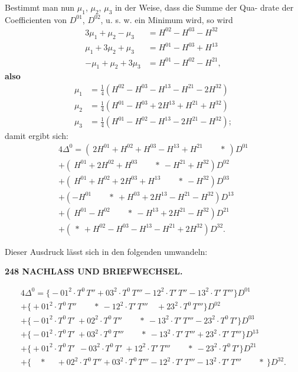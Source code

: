 \documentclass[12pt,a4paper]{article}
\theoremstyle{plain}
\theoremstyle{definition}
\theoremstyle{remark}
\begin{document}
Bestimmt man nun $\mu_1$, $\mu_2$, $\mu_3$ in der Weise, dass die Summe der Qua-
drate der Coefficienten von $D^{01}$, $D^{02}$, u. s. w. ein Minimum wird, so wird
\begin{align*}
3\mu_1 + \mu_2 - \mu_3 &= H^{02} - H^{03} - H^{32} \\
\mu_1 + 3\mu_2 + \mu_3 &= H^{01} - H^{03} + H^{13} \\
-\mu_1 + \mu_2 + 3\mu_3 &= H^{01} - H^{02} - H^{21},
\end{align*}
\textbf{also}
\begin{align*}
\mu_1 &= \tfrac{1}{4}(H^{02} - H^{03} - H^{13} - H^{21} - 2H^{32}) \\
\mu_2 &= \tfrac{1}{4}(H^{01} - H^{03} + 2H^{13} + H^{21} + H^{32}) \\
\mu_3 &= \tfrac{1}{4}(H^{01} - H^{02} - H^{13} - 2H^{21} - H^{32});
\end{align*}
damit ergibt sich:
\begin{multline*}
4\Delta^0 = (\ 2H^{01} + H^{02} + H^{03} - H^{13} + H^{21} \qquad *\ ) D^{01} \\
+ (\ H^{01} + 2H^{02} + H^{03} \qquad *\ - H^{21} + H^{32}) D^{02} \\
+ (\ H^{01} + H^{02} + 2H^{03} + H^{13} \qquad *\ - H^{32}) D^{03} \\
+ (-H^{01} \qquad *\ + H^{03} + 2H^{13} - H^{21} - H^{32}) D^{13} \\
+ (\ H^{01} - H^{02} \qquad *\ - H^{13} + 2H^{21} - H^{32}) D^{21} \\
+ (\ *\ + H^{02} - H^{03} - H^{13} - H^{21} + 2H^{32}) D^{32}.
\end{multline*}

Dieser Ausdruck l\"asst sich in den folgenden umwandeln:


\newpage

\noindent\textbf{248 NACHLASS UND BRIEFWECHSEL.}

\begin{multline*}
4\Delta^0 = \bigl\{-01^2 \cdot T^0\,T'' + 03^2 \cdot T^0\,T''' - 12^2 \cdot T'\,T'' - 13^2 \cdot T'\,T'''\bigr\} D^{01} \\
+ \bigl\{+01^2 \cdot T^0\,T'' \qquad *\ - 12^2 \cdot T'\,T''' \quad + 23^2 \cdot T^0\,T'''\bigr\} D^{02} \\
+ \bigl\{-01^2 \cdot T^0\,T'\ + 02^2 \cdot T^0\,T'' \qquad *\ - 13^2 \cdot T'\,T''' - 23^2 \cdot T^0\,T'\bigr\} D^{03} \\
+ \bigl\{-01^2 \cdot T^0\,T'\ + 03^2 \cdot T^0\,T''' \qquad *\ - 13^2 \cdot T'\,T''' + 23^2 \cdot T'\,T'''\bigr\} D^{13} \\
+ \bigl\{+01^2 \cdot T^0\,T'\ \ - 03^2 \cdot T^0\,T'\ + 12^2 \cdot T'\,T''' \qquad *\ - 23^2 \cdot T^0\,T'\bigr\} D^{21} \\
+ \bigl\{\quad *\ \quad + 02^2 \cdot T^0\,T'' + 03^2 \cdot T^0\,T''' - 12^2 \cdot T'\,T''' - 13^2 \cdot T'\,T''' \qquad *\ \bigr\} D^{32}.
\end{multline*}
\end{document}
